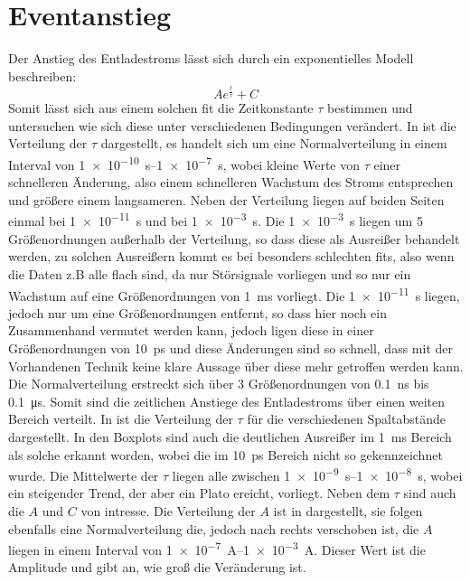\section{Eventanstieg}
Der Anstieg des Entladestroms lässt sich durch ein exponentielles Modell beschreiben:
\begin{equation}
    A e^{\frac{t}{\tau}} + C
\end{equation}
Somit lässt sich aus einem solchen fit die Zeitkonstante \(\tau\) bestimmen und untersuchen wie sich diese unter verschiedenen Bedingungen verändert. In  ist die Verteilung der \(\tau\) dargestellt, es handelt sich um eine Normalverteilung in einem Interval von \SIrange{1e-10}{1e-7}{\second}, wobei kleine Werte von \(\tau\) einer schnelleren Änderung, also einem schnelleren Wachstum des Stroms entsprechen und größere einem langsameren. Neben der Verteilung liegen auf beiden Seiten einmal bei \SI{1e-11}{\second} und bei \SI{1e-3}{\second}. Die \SI{1e-3}{\second} liegen um 5 Größenordnungen außerhalb der Verteilung, so dass diese als Ausreißer behandelt werden, zu solchen Ausreißern kommt es bei besonders schlechten fits, also wenn die Daten z.B alle flach sind, da nur Störsignale vorliegen und so nur ein Wachstum auf eine Größenordnungen von \SI{1}{\milli\second} vorliegt. Die \SI{1e-11}{\second} liegen, jedoch nur um eine Größenordnungen entfernt, so dass hier noch ein Zusammenhand vermutet werden kann, jedoch ligen diese in einer Größenordnungen von \SI{10}{\pico\second} und diese Änderungen sind so schnell, dass mit der Vorhandenen Technik keine klare Aussage über diese mehr getroffen werden kann. Die Normalverteilung erstreckt sich über 3 Größenordnungen von \SI{0,1}{\nano\second} bis \SI{0,1}{\micro\second}. Somit sind die zeitlichen Anstiege des Entladestroms über einen weiten Bereich verteilt. In  ist die Verteilung der \(\tau\) für die verschiedenen Spaltabstände dargestellt. In den Boxplots sind auch die deutlichen Ausreißer im \SI{1}{\milli\second} Bereich als solche erkannt worden, wobei die im \SI{10}{\pico\second} Bereich nicht so gekennzeichnet wurde. Die Mittelwerte der \(\tau\) liegen alle zwischen \SIrange{1e-9}{1e-8}{\second}, wobei ein steigender Trend, der aber ein Plato ereicht, vorliegt. Neben dem \(\tau\) sind auch die \(A\) und \(C\) von intresse. Die Verteilung der \(A\) ist in  dargestellt, sie folgen ebenfalls eine Normalverteilung die, jedoch nach rechts verschoben ist, die \(A\) liegen in einem Interval von \SIrange{1e-7}{1e-3}{\ampere}. Dieser Wert ist die Amplitude und gibt an, wie groß die Veränderung ist.

